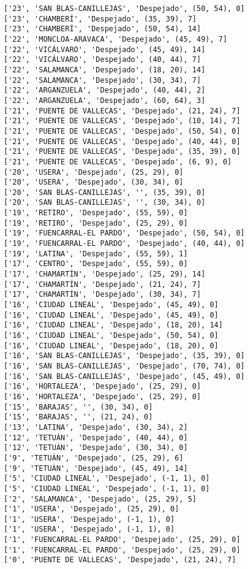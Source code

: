 \documentclass[11pt]{article}
\begin{document}
\begin{Verbatim}[commandchars=\\\{\}]
['23', 'SAN BLAS-CANILLEJAS', 'Despejado', (50, 54), 0]
['23', 'CHAMBERÍ', 'Despejado', (35, 39), 7]
['23', 'CHAMBERÍ', 'Despejado', (50, 54), 14]
['22', 'MONCLOA-ARAVACA', 'Despejado', (45, 49), 7]
['22', 'VICÁLVARO', 'Despejado', (45, 49), 14]
['22', 'VICÁLVARO', 'Despejado', (40, 44), 7]
['22', 'SALAMANCA', 'Despejado', (18, 20), 14]
['22', 'SALAMANCA', 'Despejado', (30, 34), 7]
['22', 'ARGANZUELA', 'Despejado', (40, 44), 2]
['22', 'ARGANZUELA', 'Despejado', (60, 64), 3]
['21', 'PUENTE DE VALLECAS', 'Despejado', (21, 24), 7]
['21', 'PUENTE DE VALLECAS', 'Despejado', (10, 14), 7]
['21', 'PUENTE DE VALLECAS', 'Despejado', (50, 54), 0]
['21', 'PUENTE DE VALLECAS', 'Despejado', (40, 44), 0]
['21', 'PUENTE DE VALLECAS', 'Despejado', (35, 39), 0]
['21', 'PUENTE DE VALLECAS', 'Despejado', (6, 9), 0]
['20', 'USERA', 'Despejado', (25, 29), 0]
['20', 'USERA', 'Despejado', (30, 34), 0]
['20', 'SAN BLAS-CANILLEJAS', '', (35, 39), 0]
['20', 'SAN BLAS-CANILLEJAS', '', (30, 34), 0]
['19', 'RETIRO', 'Despejado', (55, 59), 0]
['19', 'RETIRO', 'Despejado', (25, 29), 0]
['19', 'FUENCARRAL-EL PARDO', 'Despejado', (50, 54), 0]
['19', 'FUENCARRAL-EL PARDO', 'Despejado', (40, 44), 0]
['19', 'LATINA', 'Despejado', (55, 59), 1]
['17', 'CENTRO', 'Despejado', (55, 59), 0]
['17', 'CHAMARTÍN', 'Despejado', (25, 29), 14]
['17', 'CHAMARTÍN', 'Despejado', (21, 24), 7]
['17', 'CHAMARTÍN', 'Despejado', (30, 34), 7]
['16', 'CIUDAD LINEAL', 'Despejado', (45, 49), 0]
['16', 'CIUDAD LINEAL', 'Despejado', (45, 49), 0]
['16', 'CIUDAD LINEAL', 'Despejado', (18, 20), 14]
['16', 'CIUDAD LINEAL', 'Despejado', (50, 54), 0]
['16', 'CIUDAD LINEAL', 'Despejado', (18, 20), 0]
['16', 'SAN BLAS-CANILLEJAS', 'Despejado', (35, 39), 0]
['16', 'SAN BLAS-CANILLEJAS', 'Despejado', (70, 74), 0]
['16', 'SAN BLAS-CANILLEJAS', 'Despejado', (45, 49), 0]
['16', 'HORTALEZA', 'Despejado', (25, 29), 0]
['16', 'HORTALEZA', 'Despejado', (25, 29), 0]
['15', 'BARAJAS', '', (30, 34), 0]
['15', 'BARAJAS', '', (21, 24), 0]
['13', 'LATINA', 'Despejado', (30, 34), 2]
['12', 'TETUÁN', 'Despejado', (40, 44), 0]
['12', 'TETUÁN', 'Despejado', (30, 34), 0]
['9', 'TETUÁN', 'Despejado', (25, 29), 6]
['9', 'TETUÁN', 'Despejado', (45, 49), 14]
['5', 'CIUDAD LINEAL', 'Despejado', (-1, 1), 0]
['5', 'CIUDAD LINEAL', 'Despejado', (-1, 1), 0]
['2', 'SALAMANCA', 'Despejado', (25, 29), 5]
['1', 'USERA', 'Despejado', (25, 29), 0]
['1', 'USERA', 'Despejado', (-1, 1), 0]
['1', 'USERA', 'Despejado', (-1, 1), 0]
['1', 'FUENCARRAL-EL PARDO', 'Despejado', (25, 29), 0]
['1', 'FUENCARRAL-EL PARDO', 'Despejado', (25, 29), 0]
['0', 'PUENTE DE VALLECAS', 'Despejado', (21, 24), 7]

\end{Verbatim}
\end{document}
